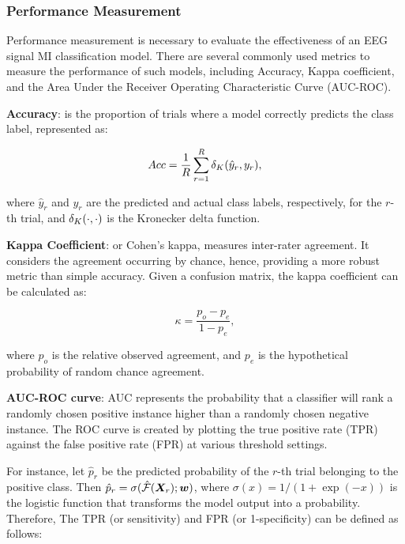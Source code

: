 \subsubsection{Performance Measurement}

Performance measurement is necessary to evaluate the effectiveness of an EEG signal MI classification model. There are several commonly used metrics to measure the performance of such models, including Accuracy, Kappa coefficient, and the Area Under the Receiver Operating Characteristic Curve (AUC-ROC).

\textbf{Accuracy}: is the proportion of trials where a model correctly predicts the class label, represented as:

\begin{equation}
Acc = \frac{1}{R} \sum_{r=1}^{R} \delta_{K}( \hat{y}_r , y_r ),
\end{equation}


where $\hat{y}_r$ and $y_r$ are the predicted and actual class labels, respectively, for the $r$-th trial, and $\delta_{K}( \cdot , \cdot )$ is the Kronecker delta function.

\textbf{Kappa Coefficient}: or Cohen’s kappa, measures inter-rater agreement. It considers the agreement occurring by chance, hence, providing a more robust metric than simple accuracy. Given a confusion matrix, the kappa coefficient can be calculated as:

\begin{equation}
\kappa = \frac{p_o - p_e}{1 - p_e}   , 
\end{equation}

where $p_o$ is the relative observed agreement, and $p_e$ is the hypothetical probability of random chance agreement.

\textbf{AUC-ROC curve}: AUC represents the probability that a classifier will rank a randomly chosen positive instance higher than a randomly chosen negative instance. The ROC curve is created by plotting the true positive rate (TPR) against the false positive rate (FPR) at various threshold settings.

For instance, let $\hat{p}_r$ be the predicted probability of the $r$-th trial belonging to the positive class. Then $\hat{p}_r = \sigma(\hat{\mathcal {F}}(\bm {X}_r); \bm {w})$, where $\sigma(x) = 1/(1 + \exp(-x))$ is the logistic function that transforms the model output into a probability. Therefore, The TPR (or sensitivity) and FPR (or 1-specificity) can be defined as follows:


